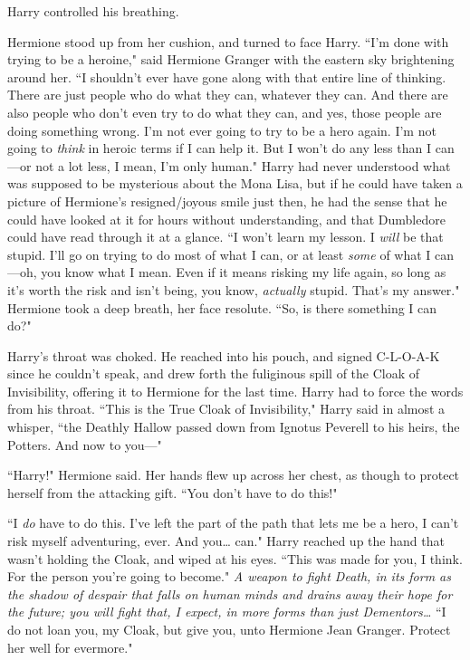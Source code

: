 Harry controlled his breathing.

Hermione stood up from her cushion, and turned to face Harry. ``I'm done with trying to be a heroine," said Hermione Granger with the eastern sky brightening around her. ``I shouldn't ever have gone along with that entire line of thinking. There are just people who do what they can, whatever they can. And there are also people who don't even try to do what they can, and yes, those people are doing something wrong. I'm not ever going to try to be a hero again. I'm not going to \emph{think} in heroic terms if I can help it. But I won't do any less than I can---or not a lot less, I mean, I'm only human." Harry had never understood what was supposed to be mysterious about the Mona Lisa, but if he could have taken a picture of Hermione's resigned/joyous smile just then, he had the sense that he could have looked at it for hours without understanding, and that Dumbledore could have read through it at a glance. ``I won't learn my lesson. I \emph{will} be that stupid. I'll go on trying to do most of what I can, or at least \emph{some} of what I can---oh, you know what I mean. Even if it means risking my life again, so long as it's worth the risk and isn't being, you know, \emph{actually} stupid. That's my answer." Hermione took a deep breath, her face resolute. ``So, is there something I can do?"

Harry's throat was choked. He reached into his pouch, and signed C-L-O-A-K since he couldn't speak, and drew forth the fuliginous spill of the Cloak of Invisibility, offering it to Hermione for the last time. Harry had to force the words from his throat. ``This is the True Cloak of Invisibility," Harry said in almost a whisper, ``the Deathly Hallow passed down from Ignotus Peverell to his heirs, the Potters. And now to you---"

``Harry!" Hermione said. Her hands flew up across her chest, as though to protect herself from the attacking gift. ``You don't have to do this!"

``I \emph{do} have to do this. I've left the part of the path that lets me be a hero, I can't risk myself adventuring, ever. And you{\ldots} can." Harry reached up the hand that wasn't holding the Cloak, and wiped at his eyes. ``This was made for you, I think. For the person you're going to become." \emph{A weapon to fight Death, in its form as the shadow of despair that falls on human minds and drains away their hope for the future; you will fight that, I expect, in more forms than just Dementors{\ldots}} ``I do not loan you, my Cloak, but give you, unto Hermione Jean Granger. Protect her well for evermore."

